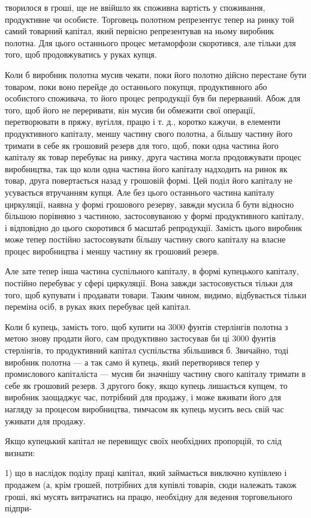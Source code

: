 творилося в гроші, ще не ввійшло як споживна вартість у споживання,
продуктивне чи особисте. Торговець полотном репрезентує
тепер на ринку той самий товарний капітал, який первісно
репрезентував на ньому виробник полотна. Для цього
останнього процес метаморфози скоротився, але тільки для того,
щоб продовжуватись у руках купця.

Коли б виробник полотна мусив чекати, поки його полотно
дійсно перестане бути товаром, поки воно перейде до останнього
покупця, продуктивного або особистого споживача, то
його процес репродукції був би перерваний. Абож для того, щоб
його не переривати, він мусив би обмежити свої операції, перетворювати
в пряжу, вугілля, працю і т. д., коротко кажучи,
в елементи продуктивного капіталу, меншу частину свого полотна,
а більшу частину його тримати в себе як грошовий резерв
для того, щоб, поки одна частина його капіталу як товар
перебуває на ринку, друга частина могла продовжувати процес
виробництва, так що коли одна частина його капіталу надходить
на ринок як товар, друга повертається назад у грошовій
формі. Цей поділ його капіталу не усувається втручанням купця.
Але без цього останнього частина капіталу циркуляції, наявна
у формі грошового резерву, завжди мусила б бути відносно
більшою порівняно з частиною, застосовуваною у формі продуктивного
капіталу, і відповідно до цього скоротився б масштаб
репродукції. Замість цього виробник може тепер постійно
застосовувати більшу частину свого капіталу на власне процес
виробництва і меншу частину як грошовий резерв.

Але зате тепер інша частина суспільного капіталу, в формі
купецького капіталу, постійно перебуває у сфері циркуляції.
Вона завжди застосовується тільки для того, щоб купувати
і продавати товари. Таким чином, видимо, відбувається тільки
переміна осіб, в руках яких перебуває цей капітал.

Коли б купець, замість того, щоб купити на 3000 фунтів
стерлінгів полотна з метою знову продати його, сам продуктивно
застосував би ці 3000 фунтів стерлінгів, то продуктивний капітал
суспільства збільшився б. Звичайно, тоді виробник полотна —
а так само й купець, який перетворився тепер у промислового
капіталіста — мусив би значнішу частину свого капіталу тримати
в себе як грошовий резерв. З другого боку, якщо купець
лишається купцем, то виробник заощаджує час, потрібний
для продажу, і може вживати його для нагляду за процесом
виробництва, тимчасом як купець мусить весь свій час уживати
для продажу.

Якщо купецький капітал не перевищує своїх необхідних пропорцій,
то слід визнати:

1) що в наслідок поділу праці капітал, який займається виключно
купівлею і продажем (а, крім грошей, потрібних для
купівлі товарів, сюди належать також гроші, які мусять витрачатись
на працю, необхідну для ведення торговельного підпри-

